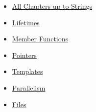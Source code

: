 \begin{itemize}
\itemsep1pt\parskip0pt
\item
  \href{http://ddili.org/ders/d.en/index.html}{All Chapters up to
  Strings}
\item
  \href{http://ddili.org/ders/d.en/lifetimes.html}{Lifetimes}
\item
  \href{http://ddili.org/ders/d.en/member_functions.html}{Member
  Functions}
\item
  \href{http://ddili.org/ders/d.en/pointers.html}{Pointers}
\item
  \href{http://ddili.org/ders/d.en/templates.html}{Templates}
\item
  \href{http://ddili.org/ders/d.en/parallelism.html}{Parallelism}
\item
  \href{http://ddili.org/ders/d.en/files.html}{Files}
\end{itemize}

